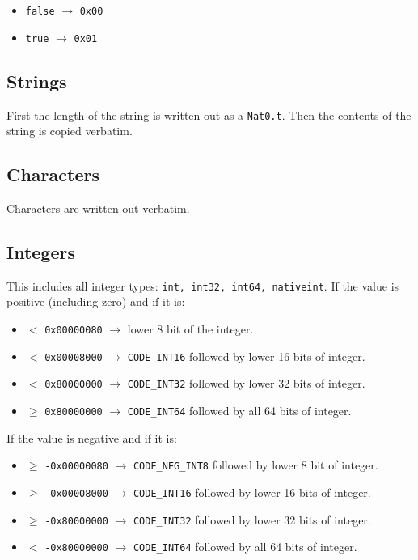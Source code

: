 \documentclass[12pt]{article}
\begin{document}
\begin{itemize}
\item \verb=false= $\rightarrow$ \verb=0x00=
\item \verb=true= $\rightarrow$ \verb=0x01=
\end{itemize}

\subsection{Strings}

First the length of the string is written out as a \verb=Nat0.t=.  Then the
contents of the string is copied verbatim.

\subsection{Characters}

Characters are written out verbatim.

\subsection{Integers}

This includes all integer types: \verb=int, int32, int64, nativeint=.
If the value is positive (including zero) and if it is:

\begin{itemize}
\item $<$ \verb=0x00000080= $\rightarrow$ lower 8 bit of the integer.
\item $<$ \verb=0x00008000= $\rightarrow$ \verb=CODE_INT16= followed by lower 16 bits of integer.
\item $<$ \verb=0x80000000= $\rightarrow$ \verb=CODE_INT32= followed by lower 32 bits of integer.
\item $\geq$ \verb=0x80000000= $\rightarrow$ \verb=CODE_INT64= followed by all 64 bits of integer.
\end{itemize}

\noindent If the value is negative and if it is:

\begin{itemize}
\item $\geq$ \verb=-0x00000080= $\rightarrow$ \verb=CODE_NEG_INT8= followed by lower 8 bit of integer.
\item $\geq$ \verb=-0x00008000= $\rightarrow$ \verb=CODE_INT16= followed by lower 16 bits of integer.
\item $\geq$ \verb=-0x80000000= $\rightarrow$ \verb=CODE_INT32= followed by lower 32 bits of integer.
\item $<$ \verb=-0x80000000= $\rightarrow$ \verb=CODE_INT64= followed by all 64 bits of integer.
\end{itemize}
\end{document}
